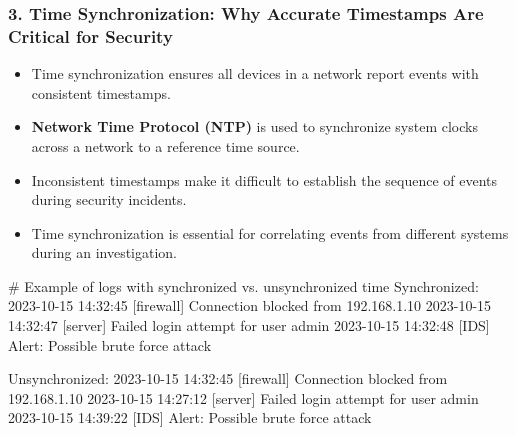 \documentclass{beamer}
\begin{document}
	\begin{frame}[fragile]
		\frametitle{3. Time Synchronization: Why Accurate Timestamps Are Critical for Security}
		\begin{itemize}
			\item Time synchronization ensures all devices in a network report events with consistent timestamps.
			\item \textbf{Network Time Protocol (NTP)} is used to synchronize system clocks across a network to a reference time source.
			\item Inconsistent timestamps make it difficult to establish the sequence of events during security incidents.
			\item Time synchronization is essential for correlating events from different systems during an investigation.
		\end{itemize}
		
		\scriptsize
		\begin{semiverbatim}
			# Example of logs with synchronized vs. unsynchronized time
			\alert{Synchronized:}
			2023-10-15 14:32:45 [firewall] Connection blocked from 192.168.1.10
			2023-10-15 14:32:47 [server] Failed login attempt for user admin
			2023-10-15 14:32:48 [IDS] Alert: Possible brute force attack
			
			\alert{Unsynchronized:}
			2023-10-15 14:32:45 [firewall] Connection blocked from 192.168.1.10
			2023-10-15 14:27:12 [server] Failed login attempt for user admin
			2023-10-15 14:39:22 [IDS] Alert: Possible brute force attack
		\end{semiverbatim}
	\end{frame}
	
\end{document}
